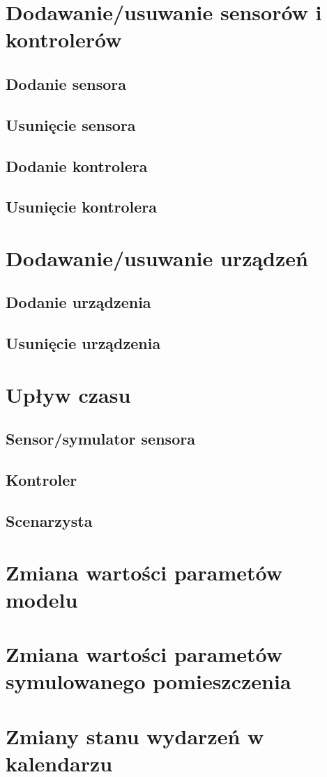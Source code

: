 \section{Dodawanie/usuwanie sensorów i kontrolerów}
\subsection*{Dodanie sensora}
\subsection*{Usunięcie sensora}
\subsection*{Dodanie kontrolera}
\subsection*{Usunięcie kontrolera}

\section{Dodawanie/usuwanie urządzeń}
\subsection*{Dodanie urządzenia}
\subsection*{Usunięcie urządzenia}

\section{Upływ czasu}
\subsection{Sensor/symulator sensora}
\subsection{Kontroler}
\subsection{Scenarzysta}

\section{Zmiana wartości parametów modelu}
\section{Zmiana wartości parametów symulowanego pomieszczenia}

\section{Zmiany stanu wydarzeń w kalendarzu}

